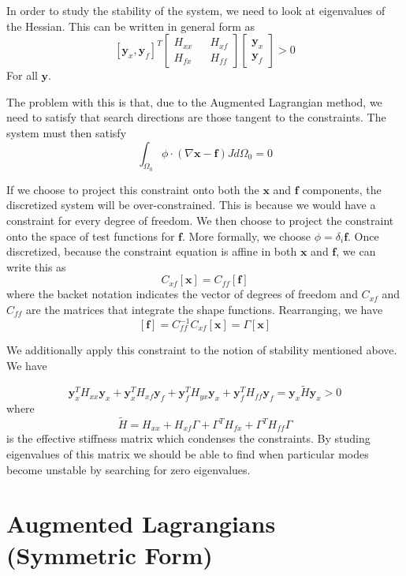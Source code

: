 \documentclass[11pt]{article}
\theoremstyle{plain}
\theoremstyle{definition}
\begin{document}
In order to study the stability of the system, we need to look at eigenvalues of the Hessian. This can be written in general form as
\[
[\mathbf{y}_x,\mathbf{y}_{f}]^T \begin{bmatrix}
H_{xx} &&  H_{xf} \\
H_{fx} &&  H_{ff}
\end{bmatrix} \begin{bmatrix}
\mathbf{y}_{x} \\ \mathbf{y}_{f}
\end{bmatrix} > 0
\]
For all $\mathbf{y}$.


The problem with this is that, due to the Augmented Lagrangian method, we need to satisfy that search directions are those tangent to the constraints. The system must then satisfy
\[
\int_{\Omega_0} \phi \cdot (\nabla \mathbf{x} - \mathbf{f}) J d\Omega_0 = 0
\]

If we choose to project this constraint onto both the $\mathbf{x}$ and $\mathbf{f}$ components, the discretized system will be over-constrained. This is because we would have a constraint for every degree of freedom. We then choose to project the constraint onto the space of test functions for $\mathbf{f}$. More formally, we choose $\phi = \delta_i \mathbf{f}$. Once discretized, because the constraint equation is affine in both $\mathbf{x}$ and $\mathbf{f}$, we can write this as
\[
C_{xf}[\mathbf{x}] = C_{ff} [\mathbf{f}]
\]
where the backet notation indicates the vector of degrees of freedom and $C_{xf}$ and $C_{ff}$ are the matrices that integrate the shape functions. Rearranging, we have
\[
[\mathbf{f}] = C_{ff}^{-1} C_{xf} [\mathbf{x}] = \Gamma [\mathbf{x}]
\]

We additionally apply this constraint to the notion of stability mentioned above. We have

\[
\mathbf{y}_x^T H_{xx} \mathbf{y}_x + \mathbf{y}_x^T H_{xf} \mathbf{y}_f + \mathbf{y}_f^T H_{yx} \mathbf{y}_x + \mathbf{y}_f^T H_{ff} \mathbf{y}_f = \mathbf{y}_x \tilde{H} \mathbf{y}_x >0
\]
where
\[
\tilde{H} =  H_{xx} + H_{xf}\Gamma + \Gamma^T H_{fx} + \Gamma^T  H_{ff}\Gamma 
\]
is the effective stiffness matrix which condenses the constraints. By studing eigenvalues of this matrix we should be able to find when particular modes become unstable by searching for zero eigenvalues.
\section{Augmented Lagrangians (Symmetric Form)}
\end{document}
